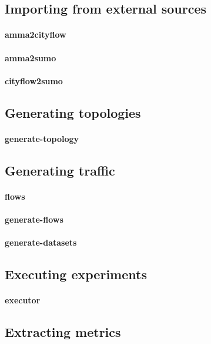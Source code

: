 \subsection{Importing from external sources}

\paragraph{amma2cityflow}
\paragraph{amma2sumo}
\paragraph{cityflow2sumo}

\subsection{Generating topologies}

\paragraph{generate-topology}

\subsection{Generating traffic}

\paragraph{flows}
\paragraph{generate-flows}
\paragraph{generate-datasets}

\subsection{Executing experiments}

\paragraph{executor}

\subsection{Extracting metrics}

